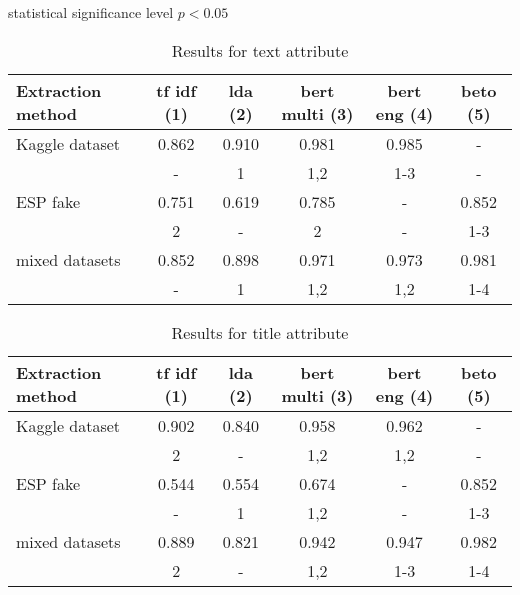 \documentclass{article}
\begin{document}
statistical significance level $ p < 0.05 $

\begin{table}[]
  \centering
  \caption{Results for text attribute}

  \begin{tabular}{|l|c|c|c|c|c|}
  \hline
  Extraction method & tf idf (1) & lda (2) & bert multi (3)  & bert eng (4) & beto (5)\\
  \hline
  Kaggle dataset     & 0.862         & 0.910           & 0.981        & 0.985        &   - \\
                & \small{-}     & \small{1}       & \small{1,2}  & \small{1-3}  &  \small{-}\\
  \hline
  ESP fake      &  0.751        & 0.619           &  0.785       & -             & 0.852 \\
                & \small{2}     & \small{-}       & \small{2}    & \small{-}     & \small{1-3} \\
  \hline
  mixed datasets & 0.852         & 0.898           & 0.971       & 0.973         & 0.981 \\
                & \small{-}   & \small{1}       & \small{1,2}    & \small{1,2}   & \small{1-4}\\
  \hline

\end{tabular}
  \label{tab:results_text}
\end{table}

\begin{table}[]
  \centering
  \caption{Results for title attribute}

  \begin{tabular}{|l|c|c|c|c|c|}
  \hline
  Extraction method & tf idf (1) & lda (2) & bert multi (3)  & bert eng (4) & beto (5)\\
  \hline
  Kaggle dataset     & 0.902         & 0.840           & 0.958        &0.962        &   - \\
                & \small{2}     &  \small{-}       & \small{1,2}  & \small{1,2}  &  \small{-}\\
  \hline
  ESP fake      &  0.544        &  0.554           &  0.674       & -             & 0.852 \\
                & \small{-}     & \small{1}       & \small{1,2}    & \small{-}     & \small{1-3} \\
  \hline
  mixed datasets & 0.889         & 0.821           & 0.942       & 0.947         &  0.982 \\
                & \small{2}   &  \small{-}       & \small{1,2}    & \small{1-3}   & \small{1-4}\\
  \hline

\end{tabular}
  \label{tab:results_title}
\end{table}
\end{document}
